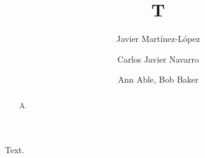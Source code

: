 \documentclass{elsarticle}
\begin{document}
\begin{frontmatter}
\title{T}
\author{Javier Martínez-López}
\author{Carlos Javier Navarro}
\author{Ann Able, Bob Baker}
\address{Univ X}
\begin{abstract}
A.
\end{abstract}
\end{frontmatter}
Text.
\end{document}

